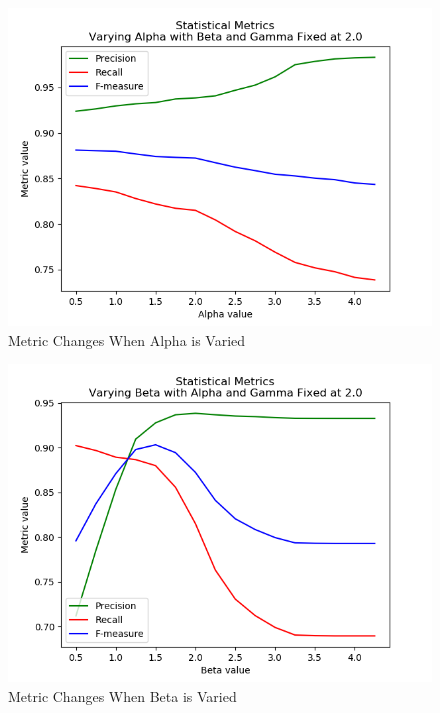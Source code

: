 \documentclass[conference]{IEEEtran}
\begin{document}
\begin{figure}
	\centering
	\includegraphics[width = 0.95 \linewidth]{AlphaResults.png}
	\caption{Metric Changes When Alpha is Varied}
	\label{alphaResults}
\end{figure}
\begin{figure}
	\centering
	\includegraphics[width = 0.95 \linewidth]{BetaResults.png}
	\caption{Metric Changes When Beta is Varied}
	\label{betaResults}
\end{figure}
\end{document}

